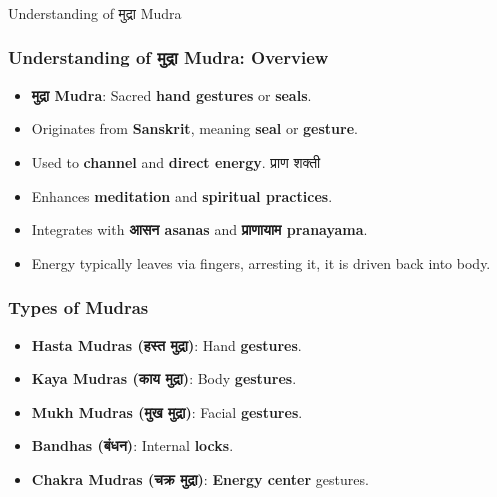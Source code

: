 \begin{frame}[fragile]\frametitle{}
\begin{center}
{\Large Understanding of मुद्रा  Mudra}
\end{center}
\end{frame}

\begin{frame}[fragile]\frametitle{Understanding of मुद्रा  Mudra: Overview}

      \begin{itemize}
        \item \textbf{मुद्रा  Mudra}: Sacred \textbf{hand gestures} or \textbf{seals}.
        \item Originates from \textbf{Sanskrit}, meaning \textbf{seal} or \textbf{gesture}.
        \item Used to \textbf{channel} and \textbf{direct energy}.  प्राण शक्ती 
        \item Enhances \textbf{meditation} and \textbf{spiritual practices}.
        \item Integrates with \textbf{आसन   asanas} and \textbf{प्राणायाम  pranayama}.
		\item Energy typically leaves via fingers, arresting it, it is driven back into body.
      \end{itemize}
\end{frame}

\begin{frame}[fragile]\frametitle{Types of Mudras}

      \begin{itemize}
        \item \textbf{Hasta Mudras (हस्त मुद्रा)}: Hand \textbf{gestures}.
        \item \textbf{Kaya Mudras (काय मुद्रा)}: Body \textbf{gestures}.
        \item \textbf{Mukh Mudras (मुख मुद्रा)}: Facial \textbf{gestures}.
        \item \textbf{Bandhas (बंधन)}: Internal \textbf{locks}.
        \item \textbf{Chakra Mudras (चक्र मुद्रा)}: \textbf{Energy center} gestures.
      \end{itemize}

\end{frame}


